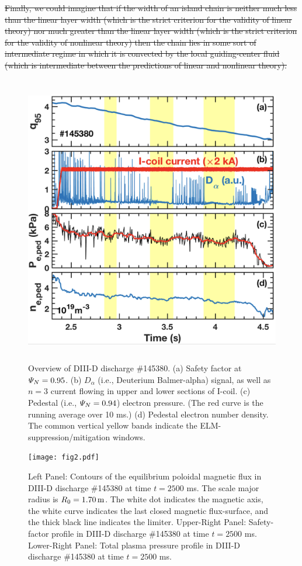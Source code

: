 \documentclass[12pt,prb,aps]{revtex4-1}
\providecommand{\DIFdel}[1]{{\protect\color{red}\sout{#1}}}                      %
\providecommand{\DIFdelend}{} %
\begin{document}
\DIFdel{Finally, we could imagine that if the width of an island chain is neither much less than the linear layer width (which is the strict
criterion for the validity of linear theory) nor much greater than the linear layer width (which is the strict criterion for
the validity of nonlinear theory) then the chain lies in some sort of intermediate regime in which it is
convected by the local guiding-center fluid (which is intermediate between the predictions of linear and nonlinear theory). 
}%

\DIFdelend \newpage

\begin{figure}
\includegraphics[height=5in]{fig1.pdf}
\caption{Overview of DIII-D discharge \#145380.
(a) Safety factor at  ${\mit\Psi}_N=0.95$. 
(b) $D_\alpha$ (i.e., Deuterium Balmer-alpha) signal, as well as $n=3$ current flowing in upper and lower sections of I-coil. 
(c) Pedestal (i.e., ${\mit\Psi}_N=0.94$)
electron pressure. (The red curve is the running average over 10 ms.) (d) Pedestal electron number density. The common vertical yellow bands indicate the ELM-suppression/mitigation windows.}\label{fig1}
\end{figure}

\begin{figure}
\texttt{[image: fig2.pdf]}
\caption{Left Panel: Contours of the equilibrium poloidal
magnetic flux in   DIII-D discharge \#145380 at time $t=2500$ ms. The scale major radius is $R_0=1.70\,{\rm m}$. The white dot indicates the magnetic axis, the white curve indicates the
last closed magnetic flux-surface, and the thick black line indicates the limiter. 
Upper-Right Panel: Safety-factor profile in DIII-D discharge \#145380 at time $t=2500$ ms. Lower-Right Panel:  Total plasma pressure profile in DIII-D discharge \#145380 at time $t=2500$ ms. } \label{fig2}
\end{figure}
\end{document}
